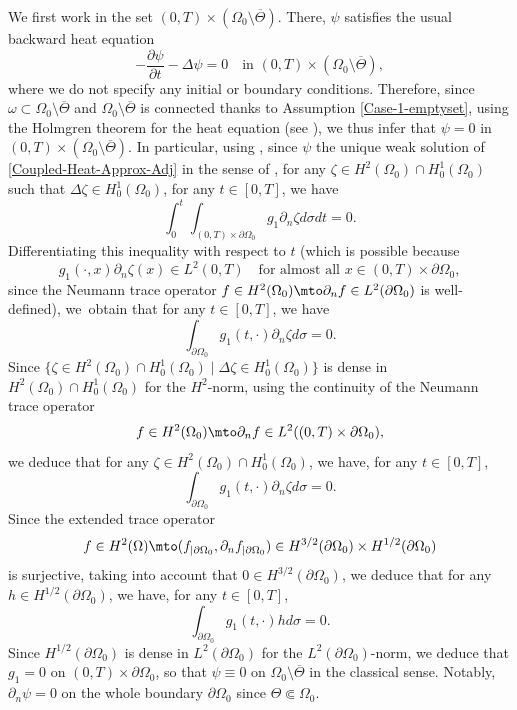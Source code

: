 We first work in the set $(0,T) \times (\Omega_0 \setminus \overline{\Theta})$. There, $\psi$ satisfies the usual backward heat equation
\[
-\dfrac{\partial \psi}{\partial t}-\Delta \psi =0\quad\text{in }(0,T) \times(\Omega_0 \setminus \overline{\Theta}),
\]
where we do not specify any initial or boundary conditions.
Therefore, since $\omega \subset \Omega_0\setminus {\overline{\Theta}}$ and $\Omega_0\setminus {\overline{\Theta}}$ is connected thanks to Assumption \eqref{Case-1-emptyset}, using the Holmgren theorem for the heat equation (see \eg \cite[\S8.6 \& Th.\,8.6.5]{Hormander-2003}), we thus infer that $\psi = 0$ in $(0,T) \times (\Omega_0 \setminus \overline{\Theta})$.
In particular, using \cite[Prop.\,7.1.3]{TWBook}, since $\psi$ the unique weak solution of \eqref{Coupled-Heat-Approx-Adj} in the sense of \cite[Def.\,7.1.2, p.\,342]{TWBook}, for any $\zeta\in H^2(\Omega_0)\cap H^1_0(\Omega_0)$ such that $\Delta \zeta \in H^1_0(\Omega_0)$, for any $t\in [0,T]$, we have
\[
\int_0^t\int_{(0,T)\times\partial\Omega_0}g_1\partial_n \zeta d\sigma dt =0.
\]
Differentiating this inequality with respect to $t$ (which is possible because
\[
g_1(\cdot,x)\partial_n \zeta(x) \in L^2(0,T)\quad \text{for almost all $x\in (0,T)\times\partial\Omega_0$},
\]
since the Neumann trace operator $f\in H^2(\Omega_0) \mto \partial_n f\in L^2(\partial\Omega_0)$ is well-defined), we~obtain that for any $t\in [0,T]$, we have
\[
\int_{\partial\Omega_0}g_1(t,\cdot)\partial_n \zeta d\sigma =0.
\]
Since $\{\zeta \in H^2(\Omega_0)\cap H^1_0(\Omega_0)\mid \Delta \zeta \in H^1_0(\Omega_0)\}$ is dense in $H^2(\Omega_0)\cap H^1_0(\Omega_0)$ for the $H^2$-norm, using the continuity of the Neumann trace operator
\[
f\in H^2(\Omega_0) \mto \partial_n f\in L^2((0,T)\times\partial\Omega_0),
\]
we deduce that for any $\zeta\in H^2(\Omega_0)\cap H^1_0(\Omega_0)$, we have, for any $t\in [0,T]$,
\[
\int_{\partial\Omega_0}g_1(t,\cdot)\partial_n \zeta d\sigma =0.
\]
Since the extended trace operator
\[
f\in H^2(\Omega)\mto (f_{|\partial\Omega_0},\partial_n f_{|\partial\Omega_0}) \in H^{3/2}(\partial\Omega_0)\times H^{1/2}(\partial\Omega_0)
\]
is surjective, taking into account that $0\in H^{3/2}(\partial\Omega_0)$, we deduce that for any $h\in H^{1/2}(\partial\Omega_0)$, we have, for any $t\in [0,T]$,
\[
\int_{\partial\Omega_0}g_1(t,\cdot) h d\sigma =0.
\]
Since $H^{1/2}(\partial\Omega_0)$ is dense in $L^2(\partial\Omega_0)$ for the $L^2(\partial\Omega_0)$-norm, we deduce that $g_1 = 0$ on $(0,T)\times \partial\Omega_0$, so that $\psi \equiv 0$ on $\Omega_0\setminus \overline{\Theta}$ in the classical sense. Notably, $\partial_n \psi= 0$ on the whole boundary $\partial \Omega_0$ since $\Theta \Subset \Omega_0$.

